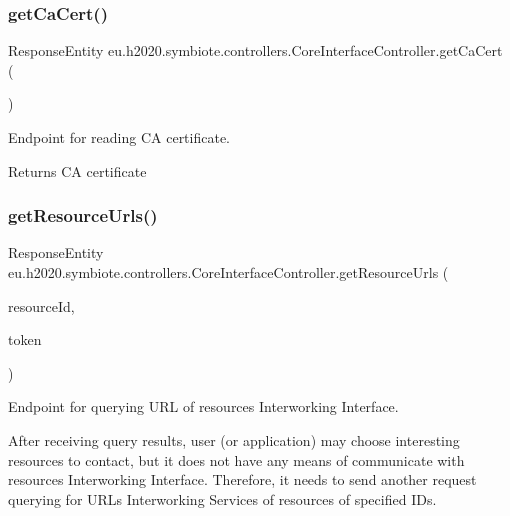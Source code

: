 \subsubsection{\texorpdfstring{get\+Ca\+Cert()}{getCaCert()}}
{\footnotesize\ttfamily Response\+Entity eu.\+h2020.\+symbiote.\+controllers.\+Core\+Interface\+Controller.\+get\+Ca\+Cert (\begin{DoxyParamCaption}{ }\end{DoxyParamCaption})}

Endpoint for reading CA certificate.

\begin{DoxyReturn}{Returns}
CA certificate 
\end{DoxyReturn}
\mbox{\label{classeu_1_1h2020_1_1symbiote_1_1controllers_1_1CoreInterfaceController_a77926783c29213efb03dee68ca69f3d4}} 
\subsubsection{\texorpdfstring{get\+Resource\+Urls()}{getResourceUrls()}}
{\footnotesize\ttfamily Response\+Entity eu.\+h2020.\+symbiote.\+controllers.\+Core\+Interface\+Controller.\+get\+Resource\+Urls (\begin{DoxyParamCaption}\item[{@Request\+Param(\char`\"{}id\char`\"{}) String \mbox{[}$\,$\mbox{]}}]{resource\+Id,  }\item[{@Request\+Header(\char`\"{}X-\/Auth-\/Token\char`\"{}) String}]{token }\end{DoxyParamCaption})}

Endpoint for querying U\+RL of resources\textquotesingle{} Interworking Interface. 

After receiving query results, user (or application) may choose interesting resources to contact, but it does not have any means of communicate with resources\textquotesingle{} Interworking Interface. Therefore, it needs to send another request querying for U\+R\+Ls Interworking Services of resources of specified I\+Ds.


